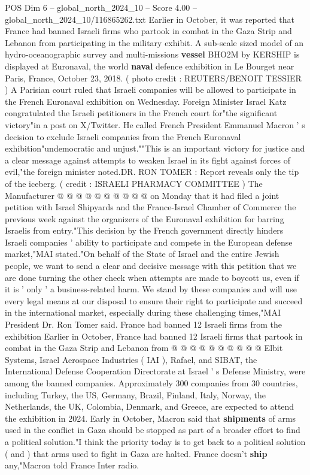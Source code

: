 \begin{textsample}{POS Dim 6 – global\_north\_2024\_10 – Score 4.00 – global\_north\_2024\_10/116865262.txt}  \label{ex:f6_pos_399}
Earlier in October, it was reported that France had banned Israeli firms who partook in combat in the Gaza Strip and Lebanon from participating in the military exhibit.
A sub-scale sized model of an hydro-oceanographic survey and multi-missions \textbf{vessel} BHO2M by KERSHIP is displayed at Euronaval, the world \textbf{naval} defence exhibition in Le Bourget near Paris, France, October 23, 2018. ( photo credit : REUTERS/BENOIT TESSIER ) A Parisian court ruled that Israeli companies will be allowed to participate in the French Euronaval exhibition on Wednesday.
Foreign Minister Israel Katz congratulated the Israeli petitioners in the French court for"the significant victory"in a post on X/Twitter.
He called French President Emmanuel Macron ' s decision to exclude Israeli companies from the French Euronaval exhibition"undemocratic and unjust.""This is an important victory for justice and a clear message against attempts to weaken Israel in its fight against forces of evil,"the foreign minister noted.DR.
RON TOMER : Report reveals only the tip of the iceberg. ( credit : ISRAELI PHARMACY COMMITTEE ) The Manufacturer @ @ @ @ @ @ @ @ @ @ on Monday that it had filed a joint petition with Israel Shipyards and the France-Israel Chamber of Commerce the previous week against the organizers of the Euronaval exhibition for barring Israelis from entry."This decision by the French government directly hinders Israeli companies ' ability to participate and compete in the European defense market,"MAI stated."On behalf of the State of Israel and the entire Jewish people, we want to send a clear and decisive message with this petition that we are done turning the other cheek when attempts are made to boycott us, even if it is ' only ' a business-related harm.
We stand by these companies and will use every legal means at our disposal to ensure their right to participate and succeed in the international market, especially during these challenging times,"MAI President Dr.
Ron Tomer said.
France had banned 12 Israeli firms from the exhibition Earlier in October, France had banned 12 Israeli firms that partook in combat in the Gaza Strip and Lebanon from @ @ @ @ @ @ @ @ @ @ Elbit Systems, Israel Aerospace Industries ( IAI ), Rafael, and SIBAT, the International Defense Cooperation Directorate at Israel ' s Defense Ministry, were among the banned companies.
Approximately 300 companies from 30 countries, including Turkey, the US, Germany, Brazil, Finland, Italy, Norway, the Netherlands, the UK, Colombia, Denmark, and Greece, are expected to attend the exhibition in 2024.
Early in October, Macron said that \textbf{shipments} of arms used in the conflict in Gaza should be stopped as part of a broader effort to find a political solution."I think the priority today is to get back to a political solution ( and ) that arms used to fight in Gaza are halted.
France doesn't \textbf{ship} any,"Macron told France Inter radio.

\end{textsample}
